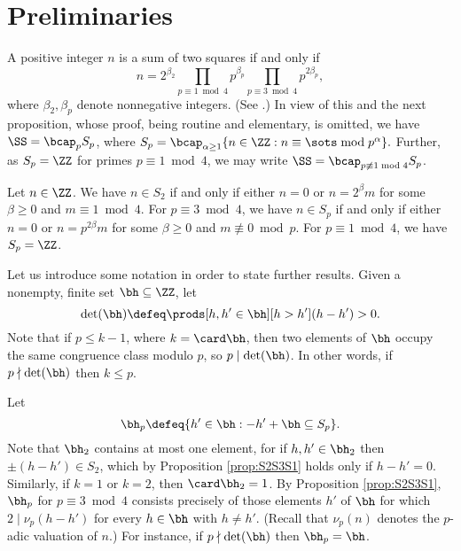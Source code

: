 \documentclass[12pt, reqno, twoside, letterpaper]{amsart}
\begin{document}
 
\section{Preliminaries}
 \label{sec:prelims}
 
A positive integer $n$ is a sum of two squares if and only if
\[
 n =
   2^{\beta_2}
    \prod_{p \equiv 1 \bmod 4}p^{\beta_p}
     \prod_{p \equiv 3 \bmod 4}p^{2\beta_p},
\]
where $\beta_2,\beta_p$ denote nonnegative integers.
%
(See \cite[Theorem 366]{HW:38}.)
%
In view of this and the next proposition, whose proof, being  
routine and elementary, is omitted, we have 
$\SS = \bcap_p S_p$, where 
$
 S_p 
  = 
   \bcap_{\alpha \ge 1} \{n \in \ZZ : n \equiv \sots \bmod p^{\alpha}\}.
$
%
Further, as $S_p = \ZZ$ for primes $p \equiv 1 \bmod 4$, we may 
write $\SS = \bcap_{p \not\equiv 1 \bmod 4} S_p$.

\begin{proposition}
 \label{prop:S2S3S1}
%
Let $n \in \ZZ$.
%
We have $n \in S_2$ if and only if either $n = 0$ or 
$n = 2^{\beta}m$ for some $\beta \ge 0$ and 
$m \equiv 1 \bmod 4$.
%
For $p \equiv 3 \bmod 4$, we have $n \in S_p$ if and only if 
either $n = 0$ or $n = p^{2\beta}m$ for some $\beta \ge 0$ and 
$m \not\equiv 0 \bmod p$.
%
For $p \equiv 1 \bmod 4$, we have $S_p = \ZZ$.
\end{proposition}

Let us introduce some notation in order to state further results.
%
Given a nonempty, finite set $\bh \subseteq \ZZ$, let
\begin{equation}
 \label{eq:defdethDh}
 \det(\bh)
  \defeq 
   \prods[h,h' \in \bh][h > h'](h - h') > 0.
\end{equation}
%
%
Note that if $p \le k - 1$, where $k = \card \bh$, then two 
elements of $\bh$ occupy the same congruence class modulo $p$, so 
$p \mid \det(\bh)$.
%
In other words, if $p \nmid \det(\bh)$ then $k \le p$.

Let 
\begin{equation}
 \label{eq:defhp}
  \bh_p \defeq \{h' \in \bh : -h' + \bh \subseteq S_p\}.
\end{equation}
%
Note that $\bh_2$ contains at most one element, for if 
$h,h' \in \bh_2$ then $\pm(h - h') \in S_2$, which by 
Proposition \ref{prop:S2S3S1} holds only if $h - h' = 0$.
%
Similarly, if $k = 1$ or $k = 2$, then $\card \bh_2 = 1$.
%
By Proposition \ref{prop:S2S3S1}, $\bh_p$ for $p \equiv 3 \bmod 4$ 
consists precisely of those elements $h'$ of $\bh$ for which 
$2 \mid \nu_p(h - h')$ for every $h \in \bh$ with $h \ne h'$.
%
(Recall that $\nu_p(n)$ denotes the $p$-adic valuation of $n$.)
%
For instance, if $p \nmid \det(\bh)$ then $\bh_p = \bh$.
\end{document}
